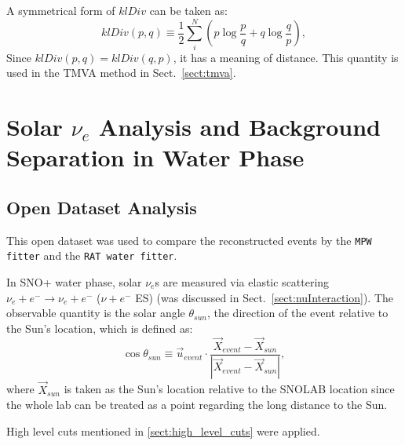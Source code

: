 A symmetrical form of $klDiv$ can be taken as:
\begin{equation}\label{eq:symKlDiv}
klDiv(p,q) \equiv \frac{1}{2}\sum_{i}^N (p\log{\frac{p}{q}}+q\log{\frac{q}{p}}),
\end{equation}
Since $klDiv(p,q)=klDiv(q,p)$, it has a meaning of distance. This quantity is used in the TMVA method in Sect.~\ref{sect:tmva}.

\section{Solar \texorpdfstring{$\nu_e$}{Lg} Analysis and Background Separation in Water Phase}
\subsection{Open Dataset Analysis}
This open dataset was used to compare the reconstructed events by the \texttt{MPW fitter} and the \texttt{RAT water fitter}.

In SNO+ water phase, solar $\nu_e$s are measured via elastic scattering $\nu_e+e^-\to \nu_e+e^-$ ($\nu+e^-$ ES) (was discussed in Sect.~\ref{sect:nuInteraction}). The observable quantity is the solar angle $\theta_{sun}$, the direction of the event relative to the Sun's location, which is defined as:
\begin{equation}
\cos\theta_{sun}\equiv \vec u_{event}\cdot \frac{\vec{X}_{event}-\vec{X}_{sun}}{|\vec{X}_{event}-\vec{X}_{sun}|},
\end{equation}
where $\vec{X}_{sun}$ is taken as the Sun's location relative to the SNOLAB location since the whole lab can be treated as a point regarding the long distance to the Sun. 

High level cuts mentioned in \ref{sect:high_level_cuts} were applied.

